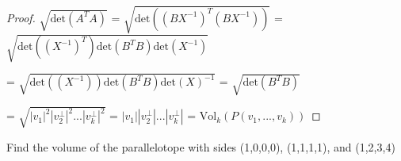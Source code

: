\begin{proof}
        \hspace{0.5cm}
        $\sqrt{\text{det}(A^TA)}$
        = $\sqrt{\text{det}((BX^{-1})^T(BX^{-1}))}$
        = $\sqrt{\text{det}((X^{-1})^T) \text{det}(B^TB) \text{det}(X^{-1})}$

        \hspace{2.8cm}
        = $\sqrt{\text{det}((X^{-1})) \text{det}(B^TB) \text{det}(X)^{-1}}$
        = $\sqrt{\text{det}(B^TB)}$
        
        \hspace{2.8cm}
        = $\sqrt{|v_1|^2 |v_2^{\perp}|^2 ... |v_k^{\perp}|^2}$
        = $|v_1| |v_2^{\perp}| ... |v_k^{\perp}|$
        = $\text{Vol}_k(P(v_1,...,v_k))$
    \end{proof}

    \vspace{0.5cm}



    \begin{example}
        Find the volume of the parallelotope with
        sides (1,0,0,0), (1,1,1,1), and (1,2,3,4)
    \end{example}

